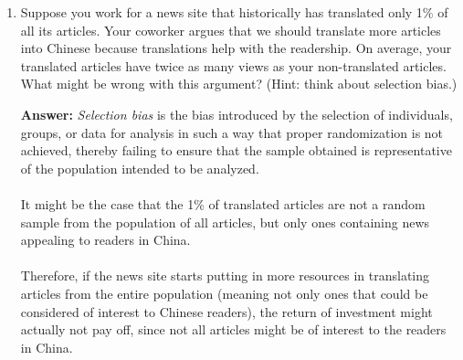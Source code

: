 \documentclass{article}
\newenvironment{QandA}{\begin{enumerate}[label=\arabic*.]}{\end{enumerate}}
\newenvironment{InnerQandA}{\begin{enumerate}[label=\roman*.]}{\end{enumerate}}
\newenvironment{answer}{\par\normalfont \textbf{Answer:}}{}
\begin{document}
\begin{QandA}
\begin{InnerQandA}
        \item Suppose you get back 100K labeled comments from 20 annotators and you want to look at some labels to estimate the quality of the labels. How many labels would you look at? How would you sample them?
        \begin{answer}
            Given that we have 20 annotators labeling 100K comments, in order to estimate the quality, we could look at 5\% of the comments (5000 out of the 100K), or roughly one annotator's workload. \\\\
            Since we are only interested in estimating the overall quality of the sample, we could perform \textit{simple random sampling}. On the other hand, if we were interested in the quality of work of each annotator, we could again perform stratified sampling, where each annotator's labeled pool of comments is considered a strata. From there, we can make a more informed decision about which annotators to retain in order to improve the overall quality of the work.
        \end{answer}
    \end{InnerQandA}    

    \item Suppose you work for a news site that historically has translated only 1\% of all its articles. Your coworker argues that we should translate more articles into Chinese because translations help with the readership. On average, your translated articles have twice as many views as your non-translated articles. What might be wrong with this argument? (Hint: think about selection bias.)
    \begin{answer}
        \textit{Selection bias} is the bias introduced by the selection of individuals, groups, or data for analysis in such a way that proper randomization is not achieved, thereby failing to ensure that the sample obtained is representative of the population intended to be analyzed. \\\\
        It might be the case that the 1\% of translated articles are not a random sample from the population of all articles, but only ones containing news appealing to readers in China. \\\\
        Therefore, if the news site starts putting in more resources in translating articles from the entire population (meaning not only ones that could be considered of interest to Chinese readers), the return of investment might actually not pay off, since not all articles might be of interest to the readers in China.
    \end{answer}


\end{QandA}
\end{document}
